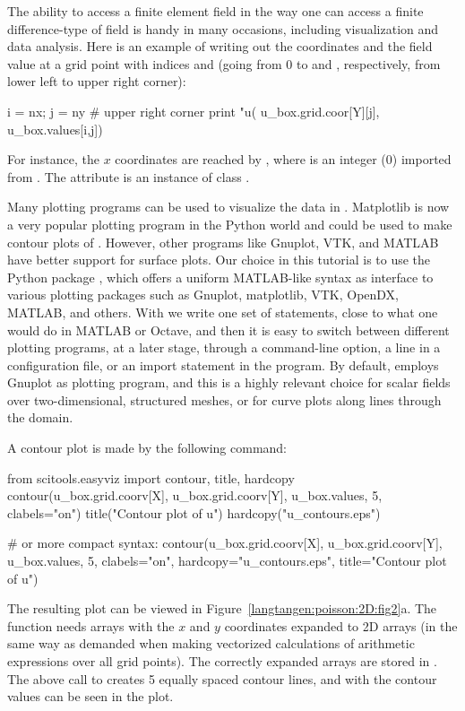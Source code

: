 The ability to access a finite element field in the way one can access
a finite difference-type of field is handy in many occasions,
including visualization and data analysis.  Here is an example of
writing out the coordinates and the field value at a grid point with
indices  and
 (going from 0 to
 and
, respectively, from lower left to
upper right corner):
\begin{python}
i = nx; j = ny   # upper right corner
print "u(%
                       u_box.grid.coor[Y][j],
                       u_box.values[i,j])
\end{python}
For instance,
the $x$ coordinates are reached by , where
 is an integer (0) imported from .
The  attribute is an instance of class .

Many plotting programs can be used to visualize the data in
. Matplotlib is now a very popular
plotting program in the Python world and could be used to make contour
plots of . However, other programs
like Gnuplot, VTK, and MATLAB have better support for surface
plots. Our choice in this tutorial is to use the Python package
, which offers a
uniform MATLAB-like syntax as interface to various plotting packages
such as Gnuplot, matplotlib, VTK, OpenDX, MATLAB, and others. With
 we write one set of
statements, close to what one would do in MATLAB or Octave, and then
it is easy to switch between different plotting programs, at a later
stage, through a command-line option, a line in a configuration file,
or an import statement in the program.  By default,
 employs Gnuplot as
plotting program, and this is a highly relevant choice for scalar
fields over two-dimensional, structured meshes, or for curve plots
along lines through the domain.

A contour plot is made by the following  command:
\begin{python}
from scitools.easyviz import contour, title, hardcopy
contour(u_box.grid.coorv[X], u_box.grid.coorv[Y], u_box.values,
        5, clabels="on")
title("Contour plot of u")
hardcopy("u_contours.eps")

# or more compact syntax:
contour(u_box.grid.coorv[X], u_box.grid.coorv[Y], u_box.values,
        5, clabels="on",
        hardcopy="u_contours.eps", title="Contour plot of u")
\end{python}
The resulting plot can be viewed in
Figure~\ref{langtangen:poisson:2D:fig2}a.  The
 function needs arrays with the
$x$ and $y$ coordinates expanded to 2D arrays (in the same way as
demanded when making vectorized 
calculations of arithmetic expressions over all grid points).  The
correctly expanded arrays are stored in
.  The above call to
 creates 5 equally spaced
contour lines, and with 
the contour values can be seen in the plot.

